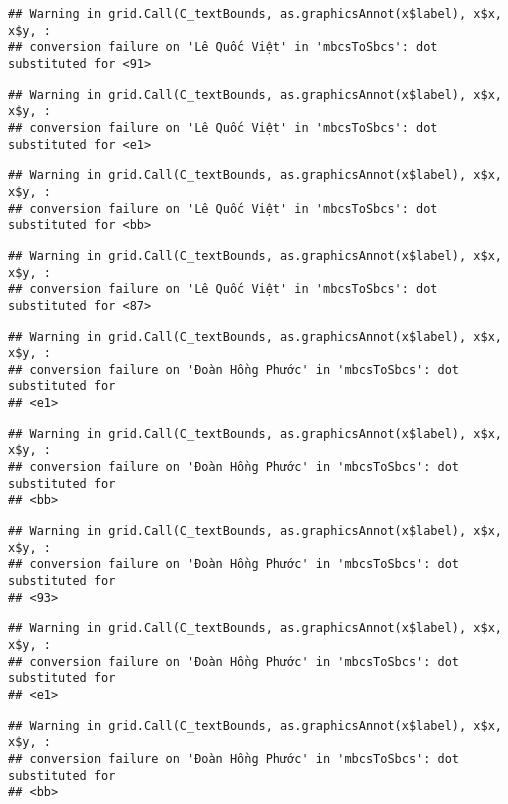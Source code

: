 \documentclass[
]{article}
\begin{document}
\begin{verbatim}
## Warning in grid.Call(C_textBounds, as.graphicsAnnot(x$label), x$x, x$y, :
## conversion failure on 'Lê Quốc Việt' in 'mbcsToSbcs': dot substituted for <91>
\end{verbatim}

\begin{verbatim}
## Warning in grid.Call(C_textBounds, as.graphicsAnnot(x$label), x$x, x$y, :
## conversion failure on 'Lê Quốc Việt' in 'mbcsToSbcs': dot substituted for <e1>
\end{verbatim}

\begin{verbatim}
## Warning in grid.Call(C_textBounds, as.graphicsAnnot(x$label), x$x, x$y, :
## conversion failure on 'Lê Quốc Việt' in 'mbcsToSbcs': dot substituted for <bb>
\end{verbatim}

\begin{verbatim}
## Warning in grid.Call(C_textBounds, as.graphicsAnnot(x$label), x$x, x$y, :
## conversion failure on 'Lê Quốc Việt' in 'mbcsToSbcs': dot substituted for <87>
\end{verbatim}

\begin{verbatim}
## Warning in grid.Call(C_textBounds, as.graphicsAnnot(x$label), x$x, x$y, :
## conversion failure on 'Đoàn Hồng Phước' in 'mbcsToSbcs': dot substituted for
## <e1>
\end{verbatim}

\begin{verbatim}
## Warning in grid.Call(C_textBounds, as.graphicsAnnot(x$label), x$x, x$y, :
## conversion failure on 'Đoàn Hồng Phước' in 'mbcsToSbcs': dot substituted for
## <bb>
\end{verbatim}

\begin{verbatim}
## Warning in grid.Call(C_textBounds, as.graphicsAnnot(x$label), x$x, x$y, :
## conversion failure on 'Đoàn Hồng Phước' in 'mbcsToSbcs': dot substituted for
## <93>
\end{verbatim}

\begin{verbatim}
## Warning in grid.Call(C_textBounds, as.graphicsAnnot(x$label), x$x, x$y, :
## conversion failure on 'Đoàn Hồng Phước' in 'mbcsToSbcs': dot substituted for
## <e1>
\end{verbatim}

\begin{verbatim}
## Warning in grid.Call(C_textBounds, as.graphicsAnnot(x$label), x$x, x$y, :
## conversion failure on 'Đoàn Hồng Phước' in 'mbcsToSbcs': dot substituted for
## <bb>
\end{verbatim}
\end{document}
